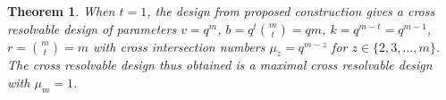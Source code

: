 \documentclass[conference]{IEEEtran}
\newtheorem{thm}{Theorem}
\begin{document}
\begin{thm}
\label{crdthm1}
		When $t = 1$, the design from proposed construction gives a  cross resolvable design of parameters $v = q^{m}$, $b = q^{t} {{m}\choose{t}} = q m$, $k = q^{m-t} = q^{m-1} $, $r = {{m}\choose{t}} = m$ with cross intersection numbers $\mu_{z} = q^{m-z}$ for $z \in \{2,3,\dots,m\}$. The cross resolvable design thus obtained is a maximal cross resolvable design with $\mu_{m} = 1$.
\end{thm}
\end{document}
